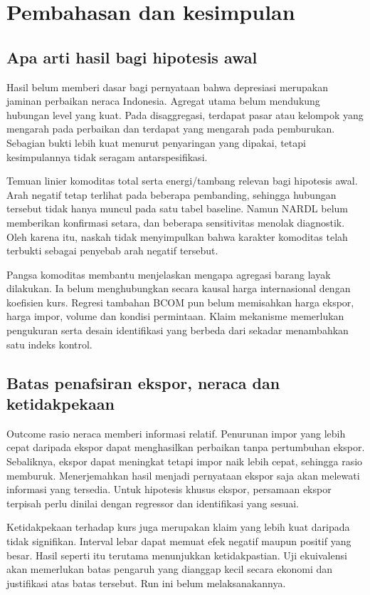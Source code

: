\section{Pembahasan dan kesimpulan}\label{sec:discussion}
\subsection{Apa arti hasil bagi hipotesis awal}
Hasil belum memberi dasar bagi pernyataan bahwa depresiasi merupakan jaminan perbaikan neraca Indonesia. Agregat utama belum mendukung hubungan level yang kuat. Pada disaggregasi, terdapat pasar atau kelompok yang mengarah pada perbaikan dan terdapat yang mengarah pada pemburukan. Sebagian bukti lebih kuat menurut penyaringan yang dipakai, tetapi kesimpulannya tidak seragam antarspesifikasi.

Temuan linier komoditas total serta energi/tambang relevan bagi hipotesis awal. Arah negatif tetap terlihat pada beberapa pembanding, sehingga hubungan tersebut tidak hanya muncul pada satu tabel baseline. Namun NARDL belum memberikan konfirmasi setara, dan beberapa sensitivitas menolak diagnostik. Oleh karena itu, naskah tidak menyimpulkan bahwa karakter komoditas telah terbukti sebagai penyebab arah negatif tersebut.

Pangsa komoditas membantu menjelaskan mengapa agregasi barang layak dilakukan. Ia belum menghubungkan secara kausal harga internasional dengan koefisien kurs. Regresi tambahan BCOM pun belum memisahkan harga ekspor, harga impor, volume dan kondisi permintaan. Klaim mekanisme memerlukan pengukuran serta desain identifikasi yang berbeda dari sekadar menambahkan satu indeks kontrol.

\subsection{Batas penafsiran ekspor, neraca dan ketidakpekaan}
Outcome rasio neraca memberi informasi relatif. Penurunan impor yang lebih cepat daripada ekspor dapat menghasilkan perbaikan tanpa pertumbuhan ekspor. Sebaliknya, ekspor dapat meningkat tetapi impor naik lebih cepat, sehingga rasio memburuk. Menerjemahkan hasil menjadi pernyataan ekspor saja akan melewati informasi yang tersedia. Untuk hipotesis khusus ekspor, persamaan ekspor terpisah perlu dinilai dengan regressor dan identifikasi yang sesuai.

Ketidakpekaan terhadap kurs juga merupakan klaim yang lebih kuat daripada tidak signifikan. Interval lebar dapat memuat efek negatif maupun positif yang besar. Hasil seperti itu terutama menunjukkan ketidakpastian. Uji ekuivalensi akan memerlukan batas pengaruh yang dianggap kecil secara ekonomi dan justifikasi atas batas tersebut. Run ini belum melaksanakannya.

